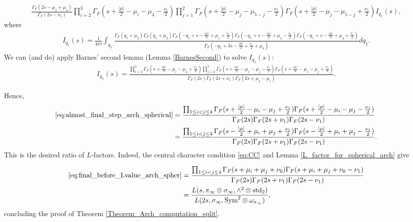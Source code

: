 \documentclass[11pt, reqno]{amsart}
\theoremstyle{plain}
\theoremstyle{definition}
\theoremstyle{remark}
\theoremstyle{plain}
\begin{document}
\small 
\begin{align}\label{eq:almost_final_step_arch_spherical}
    \tfrac{\Gamma_F(2s-\mu_1 + \mu_4)}{\Gamma_F(2s - \nu_1)}  \prod_{i=2}^3 \Gamma_F(s +  \tfrac{|\mu|}{2}- \mu_i - \mu_4 - \tfrac{\nu_1}{2}) \prod_{j=1}^2 \Gamma_F(s + \tfrac{|\mu|}{2} -  \mu_j - \mu_{5-j} -\tfrac{\nu_1}{2})\Gamma_F(s +  \tfrac{|\mu|}{2} - \mu_j -\mu_{5-j}+\tfrac{\nu_1}{2}) I_{q_1}(s), 
\end{align}\normalsize
where 
\begin{align*}
    I_{q_1}(s) = \frac{1}{4 \pi i}\int_{q_1} \tfrac{\Gamma_F(q_1+ \mu_2)\Gamma_F(q_1+ \mu_3)\Gamma_F(-q_1+s - \tfrac{|\mu|}{2} + \mu_1 + \tfrac{\nu_1}{2})\Gamma_F(-q_1+s - \tfrac{|\mu|}{2} +  \mu_4 - \tfrac{\nu_1}{2})\Gamma_F(-q_1+s - \tfrac{|\mu|}{2} +  \mu_4 + \tfrac{\nu_1}{2})}{\Gamma_F(-q_1 +3s -\tfrac{|\mu|}{2} + \tfrac{\nu_1}{2} + \mu_4)}  dq_1.
\end{align*}
We can (and do) apply Barnes' second lemma (Lemma \ref{BarnesSecond}) to solve $I_{q_1}(s)$: 
\small 
\begin{align*}
    I_{q_1}(s) = \frac{\prod_{i=2}^3\Gamma_F(s + \tfrac{|\mu|}{2} - \mu_i - \mu_4 + \tfrac{\nu_1}{2}) \prod_{j=2}^3\Gamma_F(s + \tfrac{|\mu|}{2} - \mu_1 - \mu_j - \tfrac{\nu_1}{2})\Gamma_F(s + \tfrac{|\mu|}{2} - \mu_1 - \mu_j + \tfrac{\nu_1}{2}) }{\Gamma_F(2s)\Gamma_F(2s + \nu_1)\Gamma_F(2s + \mu_4 - \mu_1)}.
\end{align*}
 \normalsize

 Hence,
 \begin{align}
     \text{\eqref{eq:almost_final_step_arch_spherical}} &= \frac{\prod_{1 \leq i <j\leq 4}\Gamma_F(s + \tfrac{|\mu|}{2} - \mu_i - \mu_j + \tfrac{\nu_1}{2})\Gamma_F(s + \tfrac{|\mu|}{2} - \mu_i - \mu_j - \tfrac{\nu_1}{2})}{\Gamma_F(2s)\Gamma_F(2s + \nu_1)\Gamma_F(2s - \nu_1)} \nonumber \\ 
     &= \frac{\prod_{1 \leq i <j\leq 4}\Gamma_F(s - \tfrac{|\mu|}{2} + \mu_i + \mu_j + \tfrac{\nu_1}{2})\Gamma_F(s - \tfrac{|\mu|}{2} + \mu_i + \mu_j - \tfrac{\nu_1}{2})}{\Gamma_F(2s)\Gamma_F(2s + \nu_1)\Gamma_F(2s - \nu_1)}. \label{eq:final_before_Lvalue_arch_spher}
 \end{align}
This is the desired ratio of $L$-factors. Indeed, the central character condition \eqref{eq:CC} and Lemma \ref{L_factor_for_spherical_arch} give 

 \begin{align*}
     \text{\eqref{eq:final_before_Lvalue_arch_spher}} &= \frac{\prod_{1 \leq i <j\leq 4}\Gamma_F(s + \mu_i + \mu_j +\nu_0)\Gamma_F(s  + \mu_i + \mu_j +\nu_0 - \nu_1)}{\Gamma_F(2s)\Gamma_F(2s + \nu_1)\Gamma_F(2s - \nu_1)}  \\
     &=  \frac{L(s, \pi_\infty \otimes \sigma_\infty, \wedge^2 \otimes {\rm std}_2)}{L(2s, \sigma_\infty, {\rm Sym}^2 \otimes \omega_{\pi_\infty})}, 
 \end{align*}
concluding the proof of Theorem \ref{Theorem_Arch_computation_split}.
\end{document}
